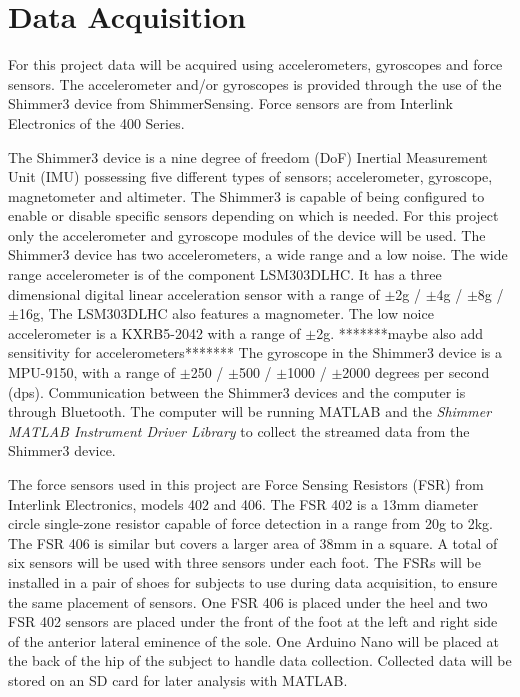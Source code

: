 \section{Data Acquisition}

For this project data will be acquired using accelerometers, gyroscopes and force sensors. The accelerometer and/or gyroscopes is provided through the use of the Shimmer3 device from ShimmerSensing. Force sensors are from Interlink Electronics of the 400 Series. %

The Shimmer3 device is a nine degree of freedom (DoF) Inertial Measurement Unit (IMU) possessing five different types of sensors; accelerometer, gyroscope, magnetometer and altimeter. The Shimmer3 is capable of being configured to enable or disable specific sensors depending on which is needed. For this project only the accelerometer and gyroscope modules of the device will be used. The Shimmer3 device has two accelerometers, a wide range and a low noise. The wide range accelerometer is of the component LSM303DLHC. It has a three dimensional digital linear acceleration sensor with a range of $\pm$2g / $\pm$4g / $\pm$8g / $\pm$16g, The LSM303DLHC also features a magnometer. \cite{LSM303DLHC, ShimmerSensing2016} %
The low noice accelerometer is a KXRB5-2042 with a range of $\pm$2g. *******maybe also add sensitivity for accelerometers*******
The gyroscope in the Shimmer3 device is a MPU-9150, with a range of $\pm$250 / $\pm$500 / $\pm$1000 / $\pm$2000 degrees per second (dps). 
Communication between the Shimmer3 devices and the computer is through Bluetooth. The computer will be running MATLAB and the \textit{Shimmer MATLAB Instrument Driver Library} to collect the streamed data from the Shimmer3 device. 

The force sensors used in this project are Force Sensing Resistors (FSR) from Interlink Electronics, models 402 and 406. The FSR 402 is a 13mm diameter circle single-zone resistor capable of force detection in a range from 20g to 2kg. The FSR 406 is similar but covers a larger area of 38mm in a square. \cite{IE400}
A total of six sensors will be used with three sensors under each foot. The FSRs will be installed in a pair of shoes for subjects to use during data acquisition, to ensure the same placement of sensors. One FSR 406 is placed under the heel and two FSR 402 sensors are placed under the front of the foot at the left and right side of the anterior lateral eminence of the sole. One Arduino Nano will be placed at the back of the hip of the subject to handle data collection. Collected data will be stored on an SD card for later analysis with MATLAB. 


